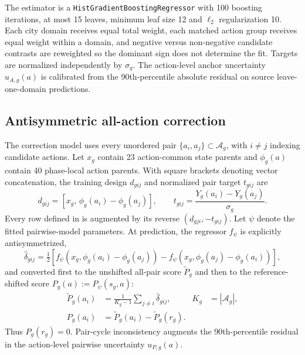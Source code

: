 The estimator is a \texttt{HistGradientBoostingRegressor} with 100 boosting
iterations, at most 15 leaves, minimum leaf size 12 and $\ell_2$ regularization
10.  Each city domain receives equal total weight, each matched action group
receives equal weight within a domain, and negative versus non-negative
candidate contrasts are reweighted so the dominant sign does not determine
the fit.  Targets are normalized independently by $\sigma_g$.  The action-level
anchor uncertainty $u_{A,g}(a)$ is calibrated from the 90th-percentile absolute
residual on source leave-one-domain predictions.

\subsection{Antisymmetric all-action correction}
\label{sec:methods-pairwise}

The correction model uses every unordered pair $\{a_i,a_j\}\subset
\mathcal{A}_g$, with $i\ne j$ indexing candidate actions.  Let $x_g$ contain
23 action-common state parents and $\phi_g(a)$ contain 40 phase-local action
parents.  With square brackets denoting vector concatenation, the training
design $d_{gij}$ and normalized pair target $t_{gij}$ are
\begin{equation}
 d_{gij}=\left[x_g,\,\phi_g(a_i)-\phi_g(a_j)\right],\qquad
 t_{gij}=\frac{Y_g(a_i)-Y_g(a_j)}{\sigma_g}.
 \label{eq:pair-design}
\end{equation}
Every row defined in  is augmented by its reverse
$(d_{gji},-t_{gij})$.  Let $\psi$ denote the fitted pairwise-model parameters.
At prediction, the regressor $f_\psi$ is explicitly antisymmetrized,
\begin{equation}
 \widehat\delta_{gij}=\tfrac{1}{2}\left[
 f_\psi(x_g,\phi_g(a_i)-\phi_g(a_j))
 -f_\psi(x_g,\phi_g(a_j)-\phi_g(a_i))\right],
 \label{eq:antisymmetry}
\end{equation}
and converted first to the unshifted all-pair score $\widetilde P_g$ and then
to the reference-shifted score $P_g(a):=P_\psi(s_g,a)$:
\begin{equation}
\begin{aligned}
 \widetilde P_g(a_i)&=\frac{1}{K_g-1}
       \sum_{j\neq i}\widehat\delta_{gij},
 &K_g&=|\mathcal{A}_g|,\\
 P_g(a_i)&=\widetilde P_g(a_i)-\widetilde P_g(r_g).
\end{aligned}
 \label{eq:borda-score}
\end{equation}
Thus $P_g(r_g)=0$.  Pair-cycle inconsistency augments the 90th-percentile
residual in the action-level pairwise uncertainty $u_{P,g}(a)$.

